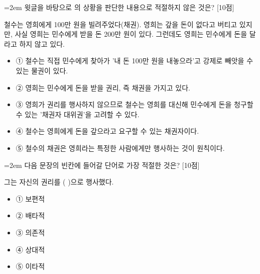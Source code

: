 \documentclass[11pt,a4paper]{article}
\newcommand{\qnum}[1]{%
  \tikz[baseline=(num.base)]{%
    \node[circle, fill=numCircle, text=white, inner sep=0pt,
          minimum size=18pt, font=\small\bfseries] (num) {#1};%
  }%
}
\newcommand{\pts}[1]{%
  \hfill\textcolor{ptsBadge}{[#1점]}%
}
\begin{document}
\vspace{4mm}
\begin{minipage}{\columnwidth}
{\hangindent=2em
\qnum{26}\enspace 윗글을 바탕으로 의 상황을 판단한 내용으로 적절하지 않은 것은? \pts{10}
\par}

\vspace{3mm}
\begin{tcolorbox}[bogi]
철수는 영희에게 100만 원을 빌려주었다(채권). 영희는 갚을 돈이 없다고 버티고 있지만, 사실 영희는 민수에게 받을 돈 200만 원이 있다. 그런데도 영희는 민수에게 돈을 달라고 하지 않고 있다.
\end{tcolorbox}
\vspace{3mm}
\begin{itemize}[leftmargin=2.5em, labelsep=0.3em, label={}, itemsep=4pt, parsep=1pt, topsep=0pt]
  \item ① 철수는 직접 민수에게 찾아가 '내 돈 100만 원을 내놓으라'고 강제로 빼앗을 수 있는 물권이 있다.
  \item ② 영희는 민수에게 돈을 받을 권리, 즉 채권을 가지고 있다.
  \item ③ 영희가 권리를 행사하지 않으므로 철수는 영희를 대신해 민수에게 돈을 청구할 수 있는 '채권자 대위권'을 고려할 수 있다.
  \item ④ 철수는 영희에게 돈을 갚으라고 요구할 수 있는 채권자이다.
  \item ⑤ 철수의 채권은 영희라는 특정한 사람에게만 행사하는 것이 원칙이다.
\end{itemize}
\end{minipage}
\vspace{4mm}

\vspace{4mm}
\begin{minipage}{\columnwidth}
{\hangindent=2em
\qnum{27}\enspace 다음 문장의 빈칸에 들어갈 단어로 가장 적절한 것은? \pts{10}
\par}

\vspace{3mm}
\begin{tcolorbox}[bogi]
그는 자신의 권리를 (          )으로 행사했다.
\end{tcolorbox}
\vspace{3mm}
\begin{itemize}[leftmargin=2.5em, labelsep=0.3em, label={}, itemsep=4pt, parsep=1pt, topsep=0pt]
  \item ① 보편적
  \item ② 배타적
  \item ③ 의존적
  \item ④ 상대적
  \item ⑤ 이타적
\end{itemize}
\end{minipage}
\vspace{4mm}
\end{document}
